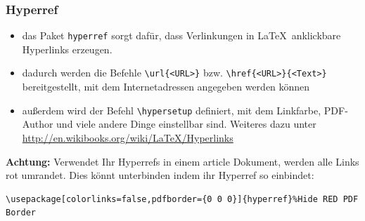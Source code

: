 \begin{frame}[fragile]
\frametitle{Hyperref}
\begin{itemize}[<+->]
  \item das Paket \texttt{hyperref} sorgt dafür, dass Verlinkungen in \LaTeX\, anklickbare Hyperlinks erzeugen.
  \item dadurch werden die Befehle \lstinline[style=Latex]+\url{<URL>}+ bzw. \lstinline[style=Latex]+\href{<URL>}{<Text>}+ bereitgestellt, mit dem Internetadressen angegeben werden können
  \item außerdem wird der Befehl \lstinline[style=Latex]+\hypersetup+ definiert, mit dem Linkfarbe, PDF-Author und viele andere Dinge einstellbar sind. Weiteres dazu unter \url{http://en.wikibooks.org/wiki/LaTeX/Hyperlinks}
\end{itemize}
\end{frame}

\begin{frame}[fragile]
\textbf{Achtung:} Verwendet Ihr Hyperrefs in einem article Dokument, werden alle Links rot umrandet. Dies könnt unterbinden indem ihr Hyperref so einbindet:

\begin{lstlisting}[style=Latex]
\usepackage[colorlinks=false,pdfborder={0 0 0}]{hyperref}%Hide RED PDF Border
\end{lstlisting}

\end{frame}

